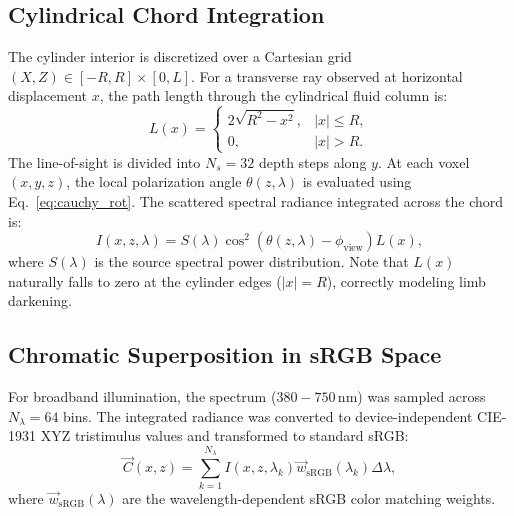 \documentclass[twocolumn,10pt,a4paper]{article}
\begin{document}
\subsection{Cylindrical Chord Integration}
The cylinder interior is discretized over a Cartesian grid $(X, Z) \in [-R, R] \times [0, L]$. For a transverse ray observed at horizontal displacement $x$, the path length through the cylindrical fluid column is:
\begin{equation}
  L(x) = 
  \begin{cases}
    2\sqrt{R^2 - x^2}, & |x| \le R, \\
    0, & |x| > R.
  \end{cases}
  \label{eq:chord}
\end{equation}
The line-of-sight is divided into $N_s = 32$ depth steps along $y$. At each voxel $(x, y, z)$, the local polarization angle $\theta(z, \lambda)$ is evaluated using Eq.~\ref{eq:cauchy_rot}. The scattered spectral radiance integrated across the chord is:
\begin{equation}
  I(x, z, \lambda) = S(\lambda) \cos^2\left(\theta(z, \lambda) - \phi_{\text{view}}\right) L(x),
  \label{eq:spectral_intensity}
\end{equation}
where $S(\lambda)$ is the source spectral power distribution. Note that $L(x)$ naturally falls to zero at the cylinder edges ($|x| = R$), correctly modeling limb darkening.

\subsection{Chromatic Superposition in sRGB Space}
For broadband illumination, the spectrum ($380-750\,\text{nm}$) was sampled across $N_\lambda = 64$ bins. The integrated radiance was converted to device-independent CIE-1931 XYZ tristimulus values and transformed to standard sRGB:
\begin{equation}
  \vec{C}(x, z) = \sum_{k=1}^{N_\lambda} I(x, z, \lambda_k) \vec{w}_{\text{sRGB}}(\lambda_k) \Delta\lambda,
  \label{eq:color_int}
\end{equation}
where $\vec{w}_{\text{sRGB}}(\lambda)$ are the wavelength-dependent sRGB color matching weights.
\end{document}
